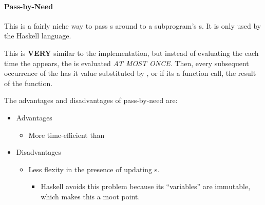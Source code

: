 \paragraph{Pass-by-Need}\label{par:Parameter_Passing-Pass_By_Need}
\begin{definition}\label{def:Pass_By_Need}
  This is a fairly niche way to pass s around to a subprogram's s.
  It is only used by the Haskell language.

  This is \textbf{VERY} similar to the  implementation, but instead of evaluating the  each time the  appears, the  is evaluated \emph{AT MOST ONCE}.
  Then, every subsequent occurrence of the  has it value substituted by , or if its a function call, the result of the  function.

  The advantages and disadvantages of pass-by-need are:
  \begin{itemize}[noitemsep]
  \item Advantages
    \begin{itemize}[noitemsep]
    \item More time-efficient than 
    \end{itemize}
  \item Disadvantages
    \begin{itemize}[noitemsep]
    \item Less flexity in the presence of updating s.
      \begin{itemize}[noitemsep]
      \item Haskell avoids this problem because its ``variables'' are immutable, which makes this a moot point.
      \end{itemize}
    \end{itemize}
  \end{itemize}
\end{definition}

